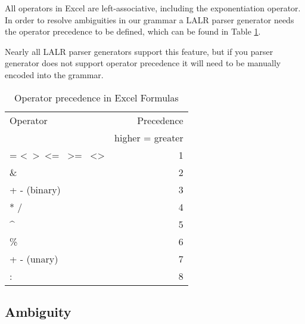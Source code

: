 \documentclass[conference]{IEEEtran}
\begin{document}
All operators in Excel are left-associative, including the exponentiation operator. In order to resolve ambiguities in our grammar a LALR parser generator needs the operator precedence to be defined, which can be found in Table \ref{table:operatorprec}.

Nearly all LALR parser generators support this feature, but if you parser generator does not support operator precedence it will need to be manually encoded into the grammar.

\begin{table}
\label{table:operatorprec}
\caption{Operator precedence in Excel Formulas}
\begin{tabular}{lr}
Operator                                                                & Precedence \\
 & higher = greater \\
= \textless \  \textgreater \  \textless= \  \textgreater= \  \textless\textgreater & 1          \\
\&                                                                      & 2          \\
+ - (binary)                                                            & 3          \\
* /                                                                     & 4          \\
\textasciicircum                                                        & 5          \\
\%                                                                      & 6          \\
+ - (unary)                                                             & 7          \\
: \texttt{\char32}                                                             & 8         
\end{tabular}
\end{table}

\subsection{Ambiguity}

\end{document}
